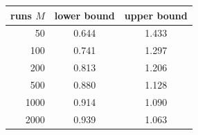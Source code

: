 \begin{tabular}{@{}rcc@{}}
\toprule
runs $M$ & lower bound & upper bound \\
\midrule
50 & 0.644 & 1.433 \\
100 & 0.741 & 1.297 \\
200 & 0.813 & 1.206 \\
500 & 0.880 & 1.128 \\
1000 & 0.914 & 1.090 \\
2000 & 0.939 & 1.063 \\
\bottomrule
\end{tabular}
